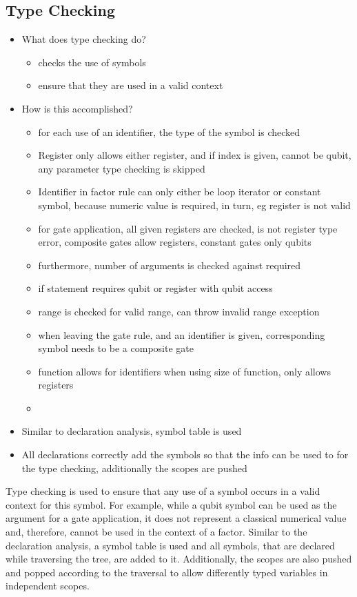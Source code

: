 \subsection{Type Checking}
\label{sec:implementation_typeCheckingAnalayis}
\begin{itemize}
    \item What does type checking do?
    \begin{itemize}
        \item checks the use of symbols
        \item ensure that they are used in a valid context
    \end{itemize}
    \item How is this accomplished?
    \begin{itemize}
        \item for each use of an identifier, the type of the symbol is checked
        \item Register only allows either register, and if index is given, cannot be qubit, any parameter type checking is skipped
        \item Identifier in factor rule can only either be loop iterator or constant symbol, because numeric value is required, in turn, eg register is not valid
        \item for gate application, all given registers are checked, is not register type error, composite gates allow registers, constant gates only qubits
        \item furthermore, number of arguments is checked against required
        \item if statement requires qubit or register with qubit access
        \item range is checked for valid range, can throw invalid range exception
        \item when leaving the gate rule, and an identifier is given, corresponding symbol needs to be a composite gate
        \item function allows for identifiers when using size of function, only allows registers
        \item 
    \end{itemize}
    \item Similar to declaration analysis, symbol table is used
    \item All declarations correctly add the symbols so that the info can be used to for the type checking, additionally the scopes are pushed  
\end{itemize}
Type checking is used to ensure that any use of a symbol occurs in a valid context for this symbol. For example, while a qubit symbol can be used as the argument for a gate application, it does not represent a classical numerical value and, therefore, cannot be used in the context of a factor. Similar to the declaration analysis, a symbol table is used and all symbols, that are declared while traversing the tree, are added to it. Additionally, the scopes are also pushed and popped according to the traversal to allow differently typed variables in independent scopes.

